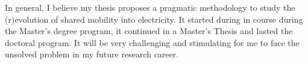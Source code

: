 In general, I believe my thesis proposes a pragmatic methodology to study the (r)evolution of shared mobility into electricity. It started during in course during the Master's degree program, it continued in a Master's Thesis and lasted the doctoral program. It will be very challenging and stimulating for me to face the unsolved problem in my future research career.

